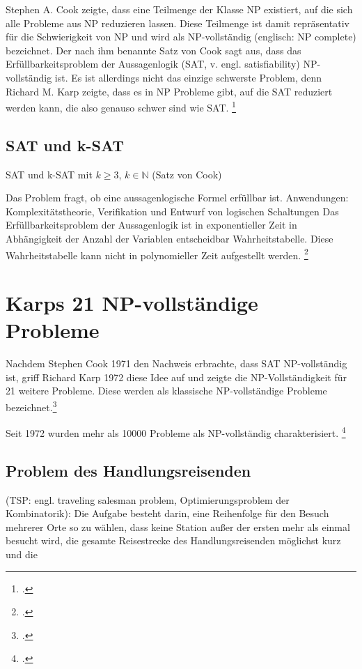 \documentclass{lehramt-informatik-haupt}
\begin{document}
Stephen A. Cook zeigte, dass eine Teilmenge der Klasse NP existiert, auf
die sich alle Probleme aus NP reduzieren lassen. Diese Teilmenge ist
damit repräsentativ für die Schwierigkeit von NP und wird als
NP-vollständig (englisch: NP complete) bezeichnet. Der nach ihm benannte
Satz von Cook sagt aus, dass das Erfüllbarkeitsproblem der Aussagenlogik
(SAT, v. engl. satisfiability) NP-vollständig ist. Es ist allerdings
nicht das einzige schwerste Problem, denn Richard M. Karp zeigte, dass
es in NP Probleme gibt, auf die SAT reduziert werden kann, die also
genauso schwer sind wie SAT.
\footcite[Seite 70]{theo:fs:4}

\subsection{SAT und k-SAT}

SAT und k-SAT mit $k \geq 3$, $k \in \mathbb{N}$ (Satz von Cook)

Das Problem fragt, ob eine aussagenlogische Formel erfüllbar ist.
Anwendungen: Komplexitätstheorie, Verifikation und Entwurf von logischen
Schaltungen Das Erfüllbarkeitsproblem der Aussagenlogik ist in
exponentieller Zeit in Abhängigkeit der Anzahl der Variablen
entscheidbar Wahrheitstabelle. Diese Wahrheitstabelle kann nicht in
polynomieller Zeit aufgestellt werden.
\footcite[Seite 71]{theo:fs:4}

\section{Karps 21 NP-vollständige Probleme}

Nachdem Stephen Cook 1971 den Nachweis erbrachte, dass SAT
NP-vollständig ist, griff Richard Karp 1972 diese Idee auf und zeigte
die NP-Vollständigkeit für 21 weitere Probleme. Diese werden als
klassische NP-vollständige Probleme bezeichnet.\footcite{wiki:karps-21}

Seit 1972 wurden mehr als 10000 Probleme als NP-vollständig
charakterisiert.
\footcite[Seite 80]{theo:fs:4}

%

\subsection{Problem des Handlungsreisenden}

(TSP: engl. traveling salesman problem, Optimierungsproblem der
Kombinatorik): Die Aufgabe besteht darin, eine Reihenfolge für den
Besuch mehrerer Orte so zu wählen, dass keine Station außer der ersten
mehr als einmal besucht wird, die gesamte Reisestrecke des
Handlungsreisenden möglichst kurz und die
\end{document}
